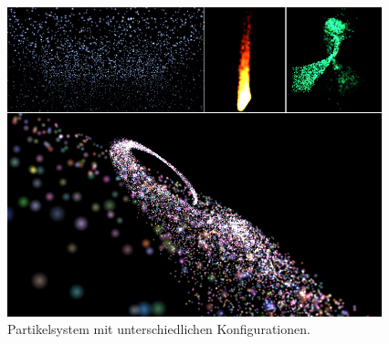 \begin{Spacing}{\mylinespace}
\begin{figure}[h!]
	\centering
	\vspace*{20px}
	\includegraphics[width=410px]{graphics/ParticleResults.png}
	\caption{Partikelsystem mit unterschiedlichen Konfigurationen.}
	\label{fig:particleResults}
\end{figure}

\end{Spacing}
\newpage
\clearpage
